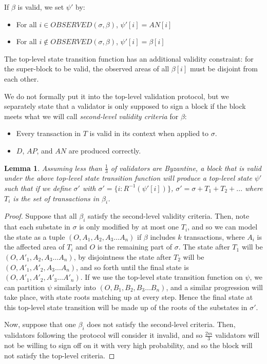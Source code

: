\documentclass[11pt,a4paper]{report}
\theoremstyle{plain}
\newtheorem{lem}[thm]{Lemma}
\theoremstyle{definition}
\theoremstyle{remark}
\begin{document}
If $\beta$ is valid, we set $\psi'$ by:

\begin{itemize}
\item
For all $i \in OBSERVED(\sigma, \beta)$, $\psi'[i] = AN[i]$
\item
For all $i \notin OBSERVED(\sigma, \beta)$, $\psi'[i] = \beta[i]$
\end{itemize}

The top-level state transition function has an additional validity constraint: for the super-block to be valid, the observed areas of all $\beta[i]$ must be disjoint from each other.

We do not formally put it into the top-level validation protocol, but we separately state that a validator is only supposed to sign a block if the block meets what we will call \emph{second-level validity criteria} for $\beta$:

\begin{itemize}
\item
Every transaction in $T$ is valid in its context when applied to $\sigma$.
\item
$D$, $AP$, and $AN$ are produced correctly.
\end{itemize}

\begin{lem}
Assuming less than $\frac{1}{3}$ of validators are Byzantine, a block that is valid under the above top-level state transition function will produce a top-level state $\psi'$ such that if we define $\sigma'$ with $\sigma' = \{i: R^{-1}(\psi'[i])\}$, $\sigma' = \sigma + T_1 + T_2 + ...$ where $T_i$ is the set of transactions in $\beta_i$.
\end{lem}

\begin{proof}
Suppose that all $\beta_i$ satisfy the second-level validity criteria. Then, note that each substate in $\sigma$ is only modified by at most one $T_i$, and so we can model the state as a tuple $(O, A_1, A_2, A_3 \ldots A_n)$ if $\beta$ includes $k$ transactions, where $A_i$ is the affected area of $T_i$ and $O$ is the remaining part of $\sigma$. The state after $T_1$ will be $(O, A'_1, A_2, A_3 \ldots A_n)$, by disjointness the state after $T_2$ will be $(O, A'_1, A'_2, A_3 \ldots A_n)$, and so forth until the final state is $(O, A'_1, A'_2, A'_3 \ldots A'_n)$. If we use the top-level state transition function on $\psi$, we can partition $\psi$ similarly into $(O, B_1, B_2, B_3 \ldots B_n)$, and a similar progression will take place, with state roots matching up at every step. Hence the final state at this top-level state transition will be made up of the roots of the substates in $\sigma'$.

Now, suppose that one $\beta_i$ does not satisfy the second-level criteria. Then, validators following the protocol will consider it invalid, and so $\frac{2m}{3}$ validators will not be willing to sign off on it with very high probability, and so the block will not satisfy the top-level criteria.
\end{proof}
\end{document}
